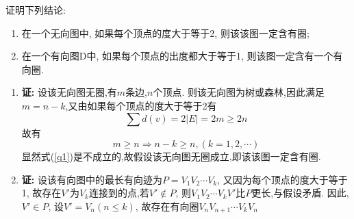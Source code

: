 \begin{problem}[习题2.1]
证明下列结论:
\begin{enumerate}
\item 在一个无向图中, 如果每个顶点的度大于等于2, 则该该图一定含有圈;
\item 在一个有向图D中, 如果每个顶点的出度都大于等于1, 则该图一定含有一个有向圈.
\end{enumerate}
\end{problem}
\begin{solution}
\begin{enumerate}
\item \textbf{证:} 设该无向图无圈,有$m$条边,$n$个顶点. 则该无向图为树或森林,因此满足$m=n-k$,又由如果每个顶点的度大于等于2有
\[
\sum d(v) = 2|E| = 2m \geq 2n
\]
故有
\begin{equation}\label{q1}
m \geq n \Longrightarrow n - k \geq n, (k = 1,2,\cdots)
\end{equation}
显然式(\ref{q1})是不成立的,故假设该无向图无圈成立,即该该图一定含有圈.
\item \textbf{证:} 设该有向图中的最长有向迹为$P=V_1V_2\cdots V_k$,
又因为每个顶点的度大于等于1, 故存在$V'$为$V_k$连接到的点,若$V' \notin P$, 则$V_1V_2\cdots V_kV'$比$P$更长,与假设矛盾. 因此, $V'\in P$, 设$V'=V_n(n\leq k)$, 故存在有向圈$V_nV_{n+1}\cdots V_kV_n$
\end{enumerate}
\end{solution}
